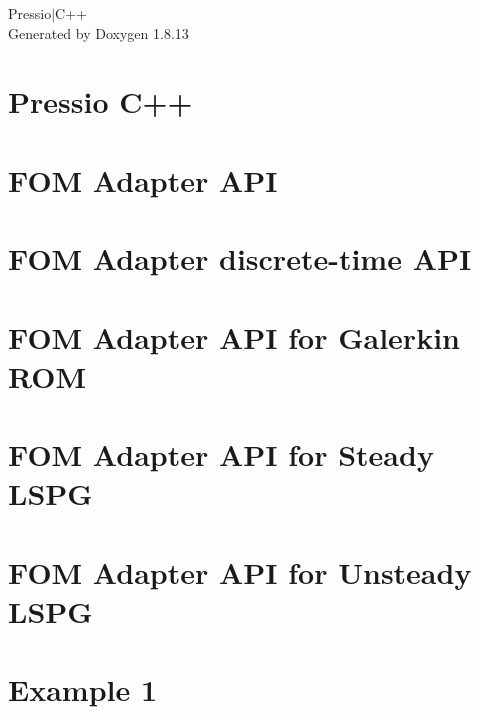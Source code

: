 \documentclass[twoside]{book}
\newcommand{\+}{\discretionary{\mbox{\scriptsize$\hookleftarrow$}}{}{}}
\newcommand{\clearemptydoublepage}{%
  \newpage{\pagestyle{empty}\cleardoublepage}%
}
\begin{document}
\hypersetup{pageanchor=false,
             bookmarksnumbered=true,
             pdfencoding=unicode
            }
\begin{titlepage}
\vspace*{7cm}
\begin{center}%
{\Large Pressio$\vert$\+C++ }\\
\vspace*{1cm}
{\large Generated by Doxygen 1.8.13}\\
\end{center}
\end{titlepage}
\clearemptydoublepage
{}
\tableofcontents
\clearemptydoublepage
{}
\hypersetup{pageanchor=true}

\chapter{Pressio C++}
\label{index}\hypertarget{index}{}
\chapter{F\+OM Adapter A\+PI}
\label{autotoc_md0}

\chapter{F\+OM Adapter discrete-\/time A\+PI}
\label{autotoc_md1}

\chapter{F\+OM Adapter A\+PI for Galerkin R\+OM}
\label{autotoc_md2}

\chapter{F\+OM Adapter A\+PI for Steady L\+S\+PG}
\label{autotoc_md5}

\chapter{F\+OM Adapter A\+PI for Unsteady L\+S\+PG}
\label{autotoc_md8}

\chapter{Example 1}
\label{autotoc_md12}

\end{document}

